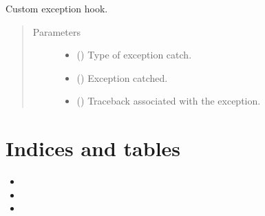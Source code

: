 \documentclass[letterpaper,10pt,english]{sphinxmanual}
\begin{document}
\begin{fulllineitems}
\label{\detokenize{NoSeMazeSchedule/scheduleMain:scheduleMain.my_exception_hook}}
\pysigstartsignatures
{}
\pysigstopsignatures
\sphinxAtStartPar
Custom exception hook.
\begin{quote}\begin{description}
\item[{Parameters}] \leavevmode\begin{itemize}
\item {} 
\sphinxAtStartPar
{} () \textendash{} Type of exception catch.

\item {} 
\sphinxAtStartPar
{} () \textendash{} Exception catched.

\item {} 
\sphinxAtStartPar
{} () \textendash{} Traceback associated with the exception.

\end{itemize}

\end{description}\end{quote}

\end{fulllineitems}



\chapter{Indices and tables}
\label{\detokenize{index:indices-and-tables}}\begin{itemize}
\item {} 
\sphinxAtStartPar
{}

\item {} 
\sphinxAtStartPar
{}

\item {} 
\sphinxAtStartPar
{}

\end{itemize}
\end{document}
